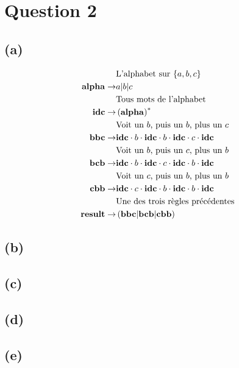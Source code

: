 \documentclass[class=article]{standalone}
\begin{document}
\section*{Question 2}
\subsection*{(a)}
\begin{align*}
&\text{L'alphabet sur $\left \{ a,b,c \right \}$}\\
{\bf{alpha}} \rightarrow& a|b|c\\
&\text{Tous mots de l'alphabet}\\
{\bf{idc}} \rightarrow& \left ( {\bf{alpha}} \right )^*\\
&\text{Voit un $b$, puis un $b$, plus un $c$}\\
{\bf{bbc}} \rightarrow& {\bf{idc}}\cdot b \cdot{\bf{idc}}\cdot b\cdot{\bf{idc}}\cdot c\cdot{\bf{idc}}\\
&\text{Voit un $b$, puis un $c$, plus un $b$}\\
{\bf{bcb}} \rightarrow& {\bf{idc}}\cdot b\cdot{\bf{idc}}\cdot c\cdot{\bf{idc}}\cdot b\cdot{\bf{idc}}\\
&\text{Voit un $c$, puis un $b$, plus un $b$}\\
{\bf{cbb}} \rightarrow& {\bf{idc}}\cdot c\cdot{\bf{idc}}\cdot b\cdot{\bf{idc}}\cdot b\cdot{\bf{idc}}\\
&\text{Une des trois règles précédentes}\\
{\bf{result}} \rightarrow& \left ( {\bf{bbc}} | {\bf{bcb}} | {\bf{cbb}} \right )
\end{align*}
\subsection*{(b)}
\subsection*{(c)}
\subsection*{(d)}
\subsection*{(e)}
\end{document}
